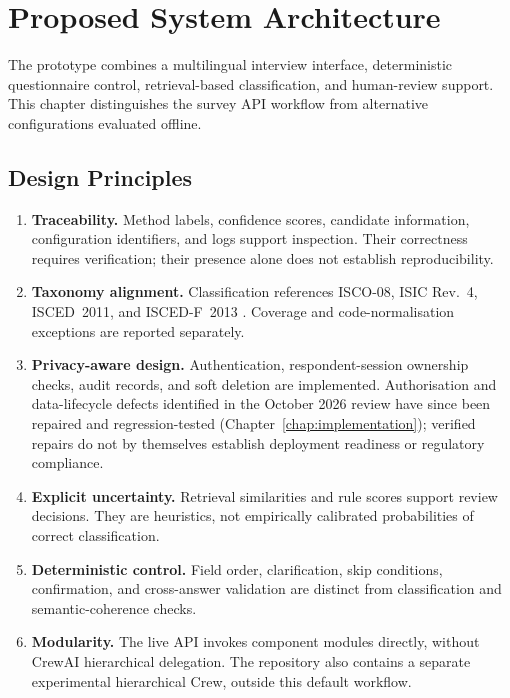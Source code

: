 \chapter{Proposed System Architecture}
\label{chap:architecture}

The prototype combines a multilingual interview interface, deterministic
questionnaire control, retrieval-based classification, and human-review
support. This chapter distinguishes the survey API workflow from
alternative configurations evaluated offline.

\section{Design Principles}
\label{sec:arch-principles}

\begin{enumerate}[label=\textbf{P\arabic*.},leftmargin=*]
\item \textbf{Traceability.} Method labels, confidence scores, candidate
information, configuration identifiers, and logs support inspection.
Their correctness requires verification; their presence alone does not
establish reproducibility.
\item \textbf{Taxonomy alignment.} Classification references ISCO-08,
ISIC Rev.~4, ISCED~2011, and ISCED-F~2013
\cite{ilo2012isco_v1,unsd2008isic,unesco2012isced,unesco2015iscedf}.
Coverage and code-normalisation exceptions are reported separately.
\item \textbf{Privacy-aware design.} Authentication, respondent-session
ownership checks, audit records, and soft deletion are implemented.
Authorisation and data-lifecycle defects identified in the October 2026
review have since been repaired and regression-tested
(Chapter~\ref{chap:implementation}); verified repairs do not by themselves
establish deployment readiness or regulatory compliance.
\item \textbf{Explicit uncertainty.} Retrieval similarities and rule
scores support review decisions. They are heuristics, not empirically
calibrated probabilities of correct classification.
\item \textbf{Deterministic control.} Field order, clarification, skip
conditions, confirmation, and cross-answer validation are distinct from
classification and semantic-coherence checks.
\item \textbf{Modularity.} The live API invokes component modules directly,
without CrewAI hierarchical delegation. The repository also contains a
separate experimental hierarchical Crew, outside this default workflow.
\end{enumerate}

